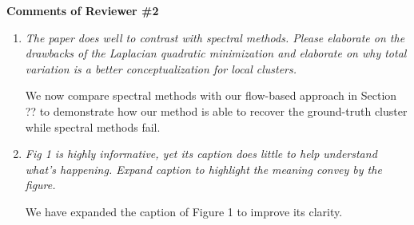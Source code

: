 \documentclass[11pt,onecolumn]{IEEEtran}
\begin{document}
\begin{center}
{\bf\large Comments of Reviewer \#2}
\vspace{1mm}
\end{center}

\begin{enumerate}

\item[2.1] {\em The paper does well to contrast with spectral methods. Please elaborate on 
	the drawbacks of the Laplacian quadratic minimization and elaborate on why total variation 
	is a better conceptualization for local clusters.}

\vspace*{2mm}
We now compare spectral methods with our flow-based approach in Section ?? to demonstrate 
how our method is able to recover the ground-truth cluster while spectral methods fail. 
\vspace*{3mm} 


\item[2.2] {\em Fig 1 is highly informative, yet its caption does little to help understand what’s happening.
Expand caption to highlight the meaning convey by the figure.
}

\vspace*{2mm}
We have expanded the caption of Figure 1 to improve its clarity. 
\vspace*{3mm} 



\end{enumerate} 
\end{document}
